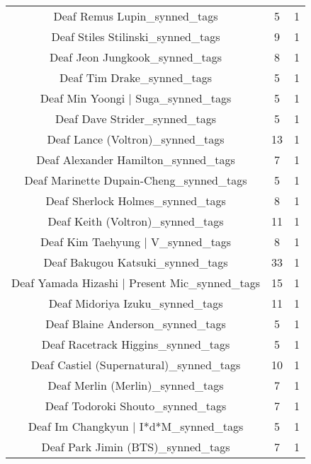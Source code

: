 \begin{table}[h!]
{\begin{tabular}{|c|c|c|}
                      Deaf Remus Lupin\_synned\_tags &           5 &          1 \\
                 Deaf Stiles Stilinski\_synned\_tags &           9 &          1 \\
                    Deaf Jeon Jungkook\_synned\_tags &           8 &          1 \\
                        Deaf Tim Drake\_synned\_tags &           5 &          1 \\
                Deaf Min Yoongi | Suga\_synned\_tags &           5 &          1 \\
                     Deaf Dave Strider\_synned\_tags &           5 &          1 \\
                  Deaf Lance (Voltron)\_synned\_tags &          13 &          1 \\
               Deaf Alexander Hamilton\_synned\_tags &           7 &          1 \\
           Deaf Marinette Dupain-Cheng\_synned\_tags &           5 &          1 \\
                  Deaf Sherlock Holmes\_synned\_tags &           8 &          1 \\
                  Deaf Keith (Voltron)\_synned\_tags &          11 &          1 \\
                 Deaf Kim Taehyung | V\_synned\_tags &           8 &          1 \\
                  Deaf Bakugou Katsuki\_synned\_tags &          33 &          1 \\
     Deaf Yamada Hizashi | Present Mic\_synned\_tags &          15 &          1 \\
                   Deaf Midoriya Izuku\_synned\_tags &          11 &          1 \\
                  Deaf Blaine Anderson\_synned\_tags &           5 &          1 \\
                Deaf Racetrack Higgins\_synned\_tags &           5 &          1 \\
           Deaf Castiel (Supernatural)\_synned\_tags &          10 &          1 \\
                  Deaf Merlin (Merlin)\_synned\_tags &           7 &          1 \\
                  Deaf Todoroki Shouto\_synned\_tags &           7 &          1 \\
             Deaf Im Changkyun | I*d*M\_synned\_tags &           5 &          1 \\
                 Deaf Park Jimin (BTS)\_synned\_tags &           7 &          1 \\

\end{tabular}}
\end{table}
